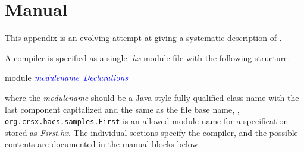 \documentclass[11pt]{article} %
\begin{document}
\appendix\small

\section{Manual}\label{app:manual}

This appendix is an evolving attempt at giving a systematic description of \HAX.

\begin{manual}\label{man:structure}
  A \HAX compiler is specified as a single \emph{.hx} module file with the following structure:
  \begin{hacs}[mathescape,xleftmargin=\parindent]
module $\text{\it\color{blue}modulename}$
{
  $\text{\it\color{blue}Declarations}$
}
  \end{hacs}
  where the \emph{modulename} should be a Java-style fully qualified class name with the last
  component capitalized and the same as the file base name, \eg, \verb|org.crsx.hacs.samples.First|
  is an allowed module name for a specification stored as \emph{First.hx}. The individual sections
  specify the compiler, and the possible contents are documented in the manual blocks below.
\end{manual}
\end{document}
